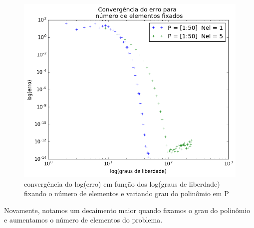 \begin{figure}[!hb]
  \includegraphics[width=.7\textwidth,center]{figuras/convergencia_erro_EDO_p.png}
  \caption{convergência do log(erro) em função dos log(graus de liberdade) fixando o número de elementos e variando grau do polinômio em P  }
\end{figure}
 Novamente, notamos um decaimento maior quando fixamos o grau do polinômio e aumentamos o número de elementos do problema.
\pagebreak
